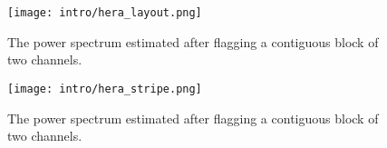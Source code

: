 \begin{figure}[th]
	\centering
	\texttt{[image: intro/hera\_layout.png]}
	\caption[HERA Layout]{The power spectrum estimated after flagging a contiguous block of two channels.}
	\label{fig:hera_layout}
\end{figure}


\begin{figure}[th]
	\centering
	\texttt{[image: intro/hera\_stripe.png]}
	\caption[HERA Field of View]{The power spectrum estimated after flagging a contiguous block of two channels.}
	\label{fig:hera_stripe}
\end{figure}
